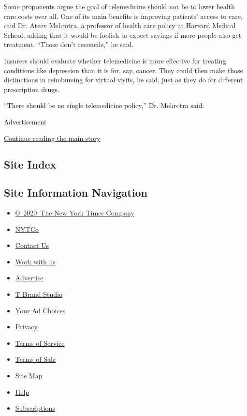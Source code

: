 Some proponents argue the goal of telemedicine should not be to lower
health care costs over all. One of its main benefits is improving
patients' access to care, said Dr. Ateev Mehrotra, a professor of health
care policy at Harvard Medical School, adding that it would be foolish
to expect savings if more people also get treatment. ``Those don't
reconcile,'' he said.

Insurers should evaluate whether telemedicine is more effective for
treating conditions like depression than it is for, say, cancer. They
could then make those distinctions in reimbursing for virtual visits, he
said, just as they do for different prescription drugs.

``There should be no single telemedicine policy,'' Dr. Mehrotra said.

Advertisement

\protect\hyperlink{after-bottom}{Continue reading the main story}

\hypertarget{site-index}{%
\subsection{Site Index}\label{site-index}}

\hypertarget{site-information-navigation}{%
\subsection{Site Information
Navigation}\label{site-information-navigation}}

\begin{itemize}
\tightlist
\item
  \href{https://help.nytimes.com/hc/en-us/articles/115014792127-Copyright-notice}{©~2020~The
  New York Times Company}
\end{itemize}

\begin{itemize}
\tightlist
\item
  \href{https://www.nytco.com/}{NYTCo}
\item
  \href{https://help.nytimes.com/hc/en-us/articles/115015385887-Contact-Us}{Contact
  Us}
\item
  \href{https://www.nytco.com/careers/}{Work with us}
\item
  \href{https://nytmediakit.com/}{Advertise}
\item
  \href{http://www.tbrandstudio.com/}{T Brand Studio}
\item
  \href{https://www.nytimes.com/privacy/cookie-policy\#how-do-i-manage-trackers}{Your
  Ad Choices}
\item
  \href{https://www.nytimes.com/privacy}{Privacy}
\item
  \href{https://help.nytimes.com/hc/en-us/articles/115014893428-Terms-of-service}{Terms
  of Service}
\item
  \href{https://help.nytimes.com/hc/en-us/articles/115014893968-Terms-of-sale}{Terms
  of Sale}
\item
  \href{https://spiderbites.nytimes.com}{Site Map}
\item
  \href{https://help.nytimes.com/hc/en-us}{Help}
\item
  \href{https://www.nytimes.com/subscription?campaignId=37WXW}{Subscriptions}
\end{itemize}
